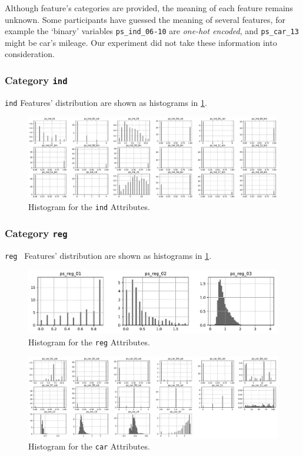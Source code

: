 \documentclass{standalone}
\begin{document}
Although feature's categories are provided, the meaning of each feature remains unknown. Some participants have guessed the meaning of several features, for example the `binary' variables  \lstinline{ps_ind_06-10} are \emph{one-hot encoded}, and \lstinline{ps_car_13} might be car's mileage.
Our experiment did not take these information into consideration.

\subsubsection{Category \lstinline{ind}}

\lstinline{ind} Features' distribution are shown as histograms in \cref{hist_ind}.

\begin{figure}[!t]
\centering
\includegraphics[width=\textwidth]{fig/ind_col.pdf}
\caption{Histogram for the \lstinline{ind} Attributes.}
\label{hist_ind}
\end{figure}

\subsubsection{Category \lstinline{reg}}

\lstinline{reg
} Features' distribution are shown as histograms in \cref{hist_ind}.

\begin{figure}[!t]
\centering
\includegraphics[width=.5\textwidth]{fig/reg_col.pdf}
\caption{Histogram for the \lstinline{reg} Attributes.}
\label{fig_reg}
\end{figure}

\begin{figure}[!t]
\centering
\includegraphics[width=\textwidth]{fig/car_col.pdf}
\caption{Histogram for the \lstinline{car} Attributes.}
\label{fig_car}
\end{figure}
\end{document}
